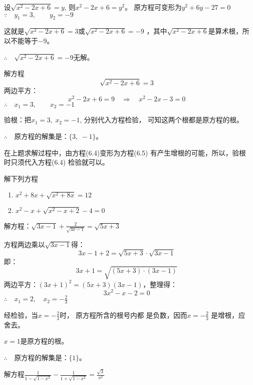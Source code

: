 \begin{solution}
    设$\sqrt{x^2-2x+6}=y$, 则$x^2-2x+6=y^2$。
原方程可变形为$y^2+6y-27=0$
$\because\quad y_1=3,\qquad y_2=-9$

这就是$\sqrt{x^2-2x+6}=3$或$\sqrt{x^2-2x+6}=-9$
，其中$\sqrt{x^2-2x+6}$是算术根，所以不能等于$-9$。

$\therefore\quad \sqrt{x^2-2x+6}=-9$无解。

解方程
\begin{equation}
    \sqrt{x^2-2x+6}=3
\end{equation}
两边平方：
\begin{equation}
    x^2-2x+6=9 \quad \Rightarrow\quad  x^2-2x-3=0
\end{equation}
$\therefore\quad x_1=3,\qquad x_2=-1$

验根：把$x_1=3,\; x_2=-1$, 分别代入方程检验，
可知这两个根都是原方程的根。

$\therefore\quad $原方程的解集是：$\{3,\;-1\}$。
\end{solution}

在上题求解过程中，由方程(6.4)变形为方程(6.5)
有产生增根的可能，所以，验根时只须代入方程(6.4)
检验就可以。

\begin{ex}
    解下列方程
    \begin{enumerate}
        \item $x^2+8x+\sqrt{x^2+8x}=12$
        \item $x^2-x+\sqrt{x^2-x+2}-4=0$
    \end{enumerate}
\end{ex}

\begin{example}
    解方程：$\sqrt{3x-1}+\frac{2}{\sqrt{3x-1}}=\sqrt{5x+3}$
\end{example}

\begin{solution}
    方程两边乘以$\sqrt{3x-1}$得：
\[3x-1+2=\sqrt{5x+3}\cdot \sqrt{3x-1} \]
即：
\[3x+1=\sqrt{(5x+3)\cdot (3x-1)}\]
两边平方：$(3x+1)^2=(5x+3)  (3x-1)$，整理得：
\[3x^2-x-2=0 \]
$\therefore\quad x_1=2,\quad x_2=-\frac{2}{3}$

经检验，当$x=-\frac{2}{3}$时，
原方程所含的根号内都
是负数，因而$x=-\frac{2}{3}$
是增根，应舍去。

$x=1$是原方程的根。

$\therefore\quad $原方程的解集是：$\{1\}$。
\end{solution}

\begin{example}
    解方程$\frac{1}{1-\sqrt{1-x^2}}-\frac{1}{1+\sqrt{1-x^2}}=\frac{\sqrt{3}}{x^2}$
\end{example}

